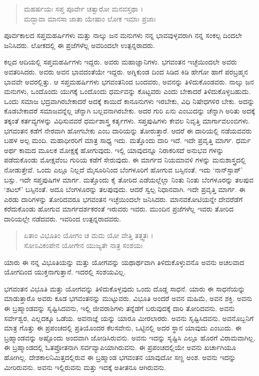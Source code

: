 \begin{verse}
ಮಹರ್ಷಯಃ ಸಪ್ತ ಪೂರ್ವೇ ಚತ್ವಾರೋ ಮನವಸ್ತಥಾ ।\\ಮದ್ಭಾವಾ ಮಾನಸಾ ಜಾತಾ ಯೇಷಾಂ ಲೋಕ ಇಮಾಃ ಪ್ರಜಾಃ 
\end{verse}

{\small ಪೂರ್ವಕಾಲದ ಸಪ್ತಮಹರ್ಷಿಗಳು ಮತ್ತು ನಾಲ್ಕು ಜನ ಮನುಗಳು ನನ್ನ ಭಾವವುಳ್ಳವರಾಗಿ ನನ್ನ ಸಂಕಲ್ಪ ದಿಂದಲೇ ಜನಿಸಿದರು. ಲೋಕದಲ್ಲಿ ಈ ಪ್ರಜೆಗಳೆಲ್ಲ ಅವರಿಂದಲೇ ಉತ್ಪನ್ನರಾದರು.}

ಕಲ್ಪದ ಆದಿಯಲ್ಲಿ ಸಪ್ತಮಹರ್ಷಿಗಳು ಇದ್ದರು. ಅವರು ಮಹಾಜ್ಞಾನಿಗಳು. ಭಗವಂತನ ಇಚ್ಛೆಯಿಂದಲೇ ಅವರು ಅವತರಿಸಿದರು. ಅವರು ಅವನ ಭಾವದಂತೆಯೇ ಇದ್ದರು. ಅಗ್ನಿಕುಂಡ ದಿಂದ ಸಿಡಿದ ಕಿಡಿ ಹೇಗೋ ಹಾಗೆ ಪರಬ್ರಹ್ಮನ ಭಾವವೇ ಅವರಲ್ಲಿತ್ತು. ಆ ಸಪ್ತಮಹರ್ಷಿಗಳು ಭಗವಂತನಿಂದ ಬಂದವರು, ಅವನನ್ನು ತಿಳಿದುಕೊಂಡವರು. ನಾಲ್ಕು ಜನ ಮನುಗಳು, ಒಂದೊಂದು ಯುಗಕ್ಕೆ ಒಂದೊಂದು ಧರ್ಮವನ್ನು ಕೊಟ್ಟವರು ಎಂದು ಬೇಕಾದರೆ ತಿಳಿದುಕೊಳ್ಳಬಹುದು. ಒಂದು ಸಮಾಜ ಭದ್ರವಾಗಿರಬೇಕಾದರೆ ಅದಕ್ಕೆ ಕಾಯಿದೆ ಕಾನೂನುಗಳು ಇರಬೇಕು, ವಿಧಿ ನಿಷೇಧಗಳಿರ ಬೇಕು. ಅದನ್ನು ಕೊಡಬೇಕಾದರೆ ಸಮಾಜವನ್ನೆಲ್ಲ ಚೆನ್ನಾಗಿ ಬಲ್ಲವನಾಗಿರಬೇಕು. ಅದರ ಗುರಿ ಏನು ಎಂಬುದನ್ನು ಚೆನ್ನಾಗಿ ಅರಿತು ಅದಕ್ಕೆ ತಕ್ಕಂತೆ ಕರ್ತವ್ಯಗಳನ್ನು ವಿಧಿಸುವವರೆ ಧರ್ಮಶಾಸ್ತ್ರ ಕರ್ತೃಗಳು. ಸಪ್ತಪುಷಿಗಳು ಕೇವಲ ನಿವೃತ್ತಿ ಮಾರ್ಗಾವಲಂಬಿಗಳು. ಭಗವಂತನ ಕಡೆಗೆ ನೇರವಾಗಿ ಹೋಗಬೇಕು ಎಂಬ ದಾರಿಯನ್ನು ತೋರುತ್ತಾರೆ. ಆದರೆ ಈ ದಾರಿಯಲ್ಲಿ ನಡೆಯವವರು ಬಹಳ ಅಲ್ಪ ಮಂದಿ. ಮಹಾಧೀರರಿಗೆ ಮಾತ್ರ ಸಾಧ್ಯ ಇದು. ಮತ್ತೊಂದು ದಾರಿ ಇದೆ. ಇದೇ ಪ್ರವೃತ್ತಿ ಮಾರ್ಗ. ಧರ್ಮ ಅರ್ಥ ಕಾಮದ ಮೂಲಕ ಮೋಕ್ಷಕ್ಕೆ ಹೋಗುವುದು. ಇಲ್ಲಿ ಯಾವುದನ್ನೂ ನಿರಾಕರಿಸದೆ ಅನುಭವ ಗಳನ್ನು ಪಡೆದುಕೊಂಡು ಮೋಕ್ಷವೆಂಬ ಗುರಿಯ ಕಡೆಗೆ ಸೇರುವುದು. ಈ ಮಾರ್ಗದ ನಿಯಮಾವಳಿ ಗಳನ್ನು ಮನುಶಾಸ್ತ್ರದಲ್ಲಿ ನೋಡುತ್ತೇವೆ. ಒಂದು ಎಲ್ಲೂ ನಿಲ್ಲದೆ ಮೈಸೂರಿನಿಂದ ಬೆಂಗಳೂರಿಗೆ ಹೋಗುವ ಬಸ್ಸಿನಂತೆ. ಇದು ‘ನಾನ್​ಸ್ಟಾಪ್​’ ಬಸ್ಸು. ಇದೇ ಸಪ್ತಪುಷಿಗಳ ಮಾರ್ಗ. ಮತ್ತೊಂದು ಕೈ ತೋರಿದ ಎಡೆಯಲ್ಲೆಲ್ಲಾ ನಿಂತು ನಿಂತು ಬೆಂಗಳೂರನ್ನು ತಲಪುವ ‘ಶಟಲ್​’ ಬಸ್ಸಿನಂತೆ. ಅದೂ ಬೆಂಗಳೂರನ್ನು ತಲಪುವುದು. ಆದರೆ ಸ್ವಲ್ಪ ನಿಧಾನವಾಗಿ. ಇದೇ ಪ್ರವೃತ್ತಿ ಮಾರ್ಗ. ಈ ಎರಡು ದಾರಿಗಳನ್ನು ತೋರಿದವರೂ ಭಗವಂತನ ಇಚ್ಛೆಯಿಂದಲೇ ಜನಿಸಿದರು. ಮಾನವಕೋಟಿಯನ್ನೇ ದೇವರೆಡೆಗೆ ಕರೆದುಕೊಂಡು ಹೋಗುವ ಮಾರ್ಗದರ್ಶಕರಂತೆ ಇರುವರು ಇವರು. ಮುಂದಿನ ಪ್ರಜೆಗಳೆಲ್ಲ ಇವರು ತೋರಿದ ದಾರಿಯಲ್ಲೇ ನಡೆದವರು. ಇವರಿಂದ ಉತ್ಪನ್ನರಾದವರು.

\begin{verse}
ಏತಾಂ ವಿಭೂತಿಂ ಯೋಗಂ ಚ ಮಮ ಯೋ ವೇತ್ತಿ ತತ್ತ್ವತಃ ।\\ಸೋಽವಿಕಂಪೇನ ಯೋಗೇನ ಯುಜ್ಯತೇ ನಾತ್ರ ಸಂಶಯಃ 
\end{verse}

{\small ಯಾರು ಈ ನನ್ನ ವಿಭೂತಿಯನ್ನು ಮತ್ತು ಯೋಗವನ್ನು ಯಥಾರ್ಥವಾಗಿ ತಿಳಿದುಕೊಳ್ಳುವನೊ ಅವನು ಅಚಲವಾದ ಯೋಗದಿಂದ ಯುಕ್ತನಾಗುತ್ತಾನೆ. ಇದರಲ್ಲಿ ಸಂಶಯವಿಲ್ಲ. }

ಭಗವಂತನ ವಿಭೂತಿ ಮತ್ತು ಯೋಗವನ್ನು ತಿಳಿದುಕೊಳ್ಳವುದು ಒಂದು ದೊಡ್ಡ ಸಾಧನೆ. ಯಾರು ಈ ಸಾಧನೆಯನ್ನು ಮಾಡುತ್ತಾರೊ ಅವರು ಕೂಡ ಭಗವಂತನನ್ನು ಮುಟ್ಟುವರು. ವಿಭೂತಿ ಅಂದರೆ ಅವನ ಮಹಿಮೆ, ಅವನ ಶಕ್ತಿ. ಅವನು ಈ ಬ್ರಹ್ಮಾಂಡವನ್ನು ಸೃಷ್ಟಿಸಿದವನು, ಇಲ್ಲಿ ಜೀವರಾಶಿಗಳು ತನ್ನೆಡೆಗೆ ಬರುವುದಕ್ಕೆ ದಾರಿ ತೋರಿದವನು. ಅವನು ಸರ್ವೇಶ್ವರ, ಎಲ್ಲದಕ್ಕೂ ಒಡೆಯ. ಅವನಾಜ್ಞೆ ಯನ್ನು ಯಾರೂ ಮೀರಲಾರರು. ಅವನು ಸೃಷ್ಟಿಸಿದವನು. ಅವನೊಬ್ಬನಿಗೆ ಮಾತ್ರ ಗೊತ್ತು ಈ ಪ್ರಪಂಚದಲ್ಲಿ ಪ್ರತಿಯೊಂದರ ಕೆಲಸವೇನು, ಒಟ್ಟಿನಲ್ಲಿ ಅದರ ಸ್ಥಾನ ಯಾವುದು ಎಂಬುದು. ಈ ಬ್ರಹ್ಮಾಂಡವನ್ನು ಅಷ್ಟೊಂದು ಅಂದವಾಗಿ ಜೋಡಿಸಿರುವನು. ಅವನು ಇದನ್ನು ಸೃಷ್ಟಿಸಿ ಎಲ್ಲೂ ಹೊರಗೆ ವಿರಾಮವಾಗಿಲ್ಲ. ಈ ಬ್ರಹ್ಮಾಂಡದಲ್ಲಿ ಓತಪ್ರೋತನಾಗಿ ಸರ್ವವ್ಯಾಪಿಯಾಗಿರುವನು. ಈ ಪ್ರಪಂಚದಲ್ಲಿಯೇ ಅವನು ಖರ್ಚಾಗಿಯೂ ಹೋಗಿಲ್ಲ. ದೇಶಕಾಲನಿಮಿತ್ತದಲ್ಲಿರುವ ಈ ಬ್ರಹ್ಮಾಂಡ ಭಗವಂತನ ಯಾವುದೋ ಸಣ್ಣ ಅಂಶ. ಅವನು ಇದನ್ನು ಮೀರಿರುವನು. ಅವನು ಇಲ್ಲಿರುವನು ಮತ್ತು ಇದಕ್ಕೆ ಅತೀತನೂ ಆಗಿರುವನು.

